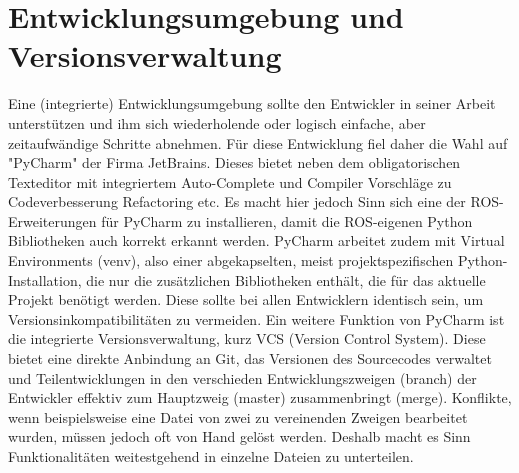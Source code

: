 \section{Entwicklungsumgebung und Versionsverwaltung}
Eine (integrierte) Entwicklungsumgebung sollte den Entwickler in seiner Arbeit unterstützen und ihm sich wiederholende oder logisch einfache, aber zeitaufwändige Schritte abnehmen. Für diese Entwicklung fiel daher die Wahl auf "PyCharm" der Firma JetBrains. Dieses bietet neben dem obligatorischen Texteditor mit integriertem Auto-Complete und Compiler Vorschläge zu Codeverbesserung Refactoring etc. Es macht hier jedoch Sinn sich eine der ROS-Erweiterungen für PyCharm zu installieren, damit die ROS-eigenen Python Bibliotheken auch korrekt erkannt werden. PyCharm arbeitet zudem mit Virtual Environments (venv), also einer abgekapselten, meist projektspezifischen Python-Installation, die nur die zusätzlichen Bibliotheken enthält, die für das aktuelle Projekt benötigt werden. Diese sollte bei allen Entwicklern identisch sein, um Versionsinkompatibilitäten zu vermeiden. Ein weitere Funktion von PyCharm ist die integrierte Versionsverwaltung, kurz VCS (Version Control System). Diese bietet eine direkte Anbindung an Git, das Versionen des Sourcecodes verwaltet und Teilentwicklungen in den verschieden Entwicklungszweigen (branch) der Entwickler effektiv zum Hauptzweig (master) zusammenbringt (merge). Konflikte, wenn beispielsweise eine Datei von zwei zu vereinenden Zweigen bearbeitet wurden, müssen jedoch oft von Hand gelöst werden. Deshalb macht es Sinn Funktionalitäten weitestgehend in einzelne Dateien zu unterteilen. 
